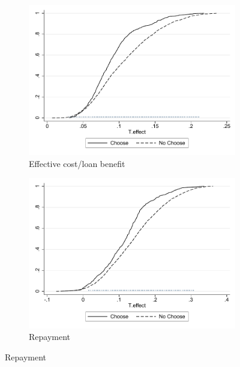 \documentclass[oneside,11pt]{article}
\begin{document}
\begin{figure}[H]
    \caption{}
    \label{}
    \begin{center}
    \begin{subfigure}{0.475\textwidth}
        \caption{Effective cost/loan benefit}
        \centering
        \includegraphics[width=\textwidth]{Figuras/cdf_predchoose_tau_eff.pdf}
    \end{subfigure}
    \begin{subfigure}{0.475\textwidth}
        \caption{Repayment}
        \centering
        \includegraphics[width=\textwidth]{Figuras/cdf_predchoose_tau_des.pdf}
    \end{subfigure}
  

\end{center}
\end{figure}
\end{document}
